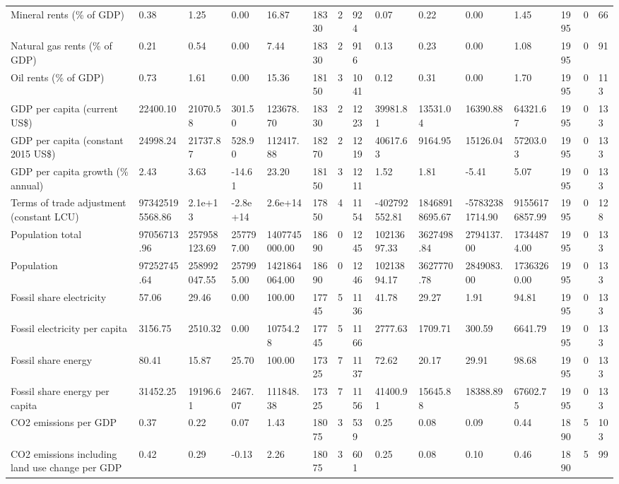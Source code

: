 \begin{longtable}{lllllllllllllll}
\addlinespace
Mineral rents (\% of GDP) & 0.38 & 1.25 & 0.00 & 16.87 & 18330 & 2 & 924 & 0.07 & 0.22 & 0.00 & 1.45 & 1995 & 0 & 66\\
Natural gas rents (\% of GDP) & 0.21 & 0.54 & 0.00 & 7.44 & 18330 & 2 & 916 & 0.13 & 0.23 & 0.00 & 1.08 & 1995 & 0 & 91\\
Oil rents (\% of GDP) & 0.73 & 1.61 & 0.00 & 15.36 & 18150 & 3 & 1041 & 0.12 & 0.31 & 0.00 & 1.70 & 1995 & 0 & 113\\
GDP per capita (current US\$) & 22400.10 & 21070.58 & 301.50 & 123678.70 & 18330 & 2 & 1223 & 39981.81 & 13531.04 & 16390.88 & 64321.67 & 1995 & 0 & 133\\
GDP per capita (constant 2015 US\$) & 24998.24 & 21737.87 & 528.90 & 112417.88 & 18270 & 2 & 1219 & 40617.63 & 9164.95 & 15126.04 & 57203.03 & 1995 & 0 & 133\\
\addlinespace
GDP per capita growth (\% annual) & 2.43 & 3.63 & -14.61 & 23.20 & 18150 & 3 & 1211 & 1.52 & 1.81 & -5.41 & 5.07 & 1995 & 0 & 133\\
Terms of trade adjustment (constant LCU) & 973425195568.86 & 2.1e+13 & -2.8e+14 & 2.6e+14 & 17850 & 4 & 1154 & -402792552.81 & 18468918695.67 & -57832381714.90 & 91556176857.99 & 1995 & 0 & 128\\
Population total & 97056713.96 & 257958123.69 & 257797.00 & 1407745000.00 & 18690 & 0 & 1245 & 10213697.33 & 3627498.84 & 2794137.00 & 17344874.00 & 1995 & 0 & 133\\
Population & 97252745.64 & 258992047.55 & 257995.00 & 1421864064.00 & 18690 & 0 & 1246 & 10213894.17 & 3627770.78 & 2849083.00 & 17363260.00 & 1995 & 0 & 133\\
Fossil share electricity & 57.06 & 29.46 & 0.00 & 100.00 & 17745 & 5 & 1136 & 41.78 & 29.27 & 1.91 & 94.81 & 1995 & 0 & 133\\
\addlinespace
Fossil electricity per capita & 3156.75 & 2510.32 & 0.00 & 10754.28 & 17745 & 5 & 1166 & 2777.63 & 1709.71 & 300.59 & 6641.79 & 1995 & 0 & 133\\
Fossil share energy & 80.41 & 15.87 & 25.70 & 100.00 & 17325 & 7 & 1137 & 72.62 & 20.17 & 29.91 & 98.68 & 1995 & 0 & 133\\
Fossil share energy per capita & 31452.25 & 19196.61 & 2467.07 & 111848.38 & 17325 & 7 & 1156 & 41400.91 & 15645.88 & 18388.89 & 67602.75 & 1995 & 0 & 133\\
CO2 emissions per GDP & 0.37 & 0.22 & 0.07 & 1.43 & 18075 & 3 & 539 & 0.25 & 0.08 & 0.09 & 0.44 & 1890 & 5 & 103\\
CO2 emissions including land use change per GDP & 0.42 & 0.29 & -0.13 & 2.26 & 18075 & 3 & 601 & 0.25 & 0.08 & 0.10 & 0.46 & 1890 & 5 & 99\\

\end{longtable}
